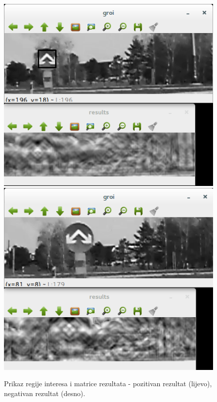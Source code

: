 \begin{figure}[!htb]
    \includegraphics[width=\linewidth]{figures/12.png}
\endminipage\hfill
{}
    \includegraphics[width=\linewidth]{figures/13.png}
\endminipage\hfill
\caption{Prikaz regije interesa i matrice rezultata - pozitivan rezultat 
(lijevo), negativan rezultat (desno).}
\label{fig:obz3}
\end{figure}

